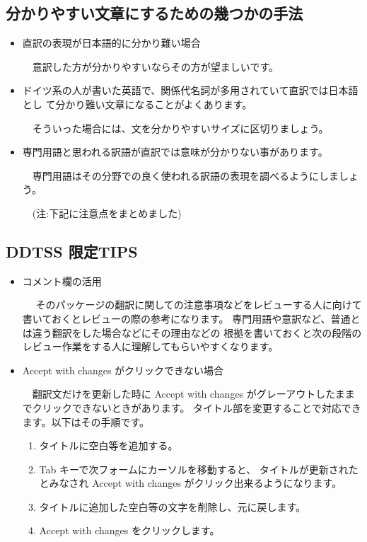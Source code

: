 \documentclass[mingoth,a4paper]{jsarticle}
\begin{document}
\subsection{分かりやすい文章にするための幾つかの手法}
\begin{itemize}
\item {直訳の表現が日本語的に分かり難い場合

　意訳した方が分かりやすいならその方が望ましいです。}

\item{ドイツ系の人が書いた英語で、関係代名詞が多用されていて直訳では日本語とし
     て分かり難い文章になることがよくあります。

　そういった場合には、文を分かりやすいサイズに区切りましょう。}

\item{専門用語と思われる訳語が直訳では意味が分かりない事があります。

　専門用語はその分野での良く使われる訳語の表現を調べるようにしましょう。

     　(注:下記に注意点をまとめました)}
\end{itemize}

\subsection{DDTSS 限定TIPS}
\begin{itemize}
 \item{コメント欄の活用

　 そのパッケージの翻訳に関しての注意事項などをレビューする人に向けて書いておくとレビューの際の参考になります。
   専門用語や意訳など、普通とは違う翻訳をした場合などにその理由などの
   根拠を書いておくと次の段階のレビュー作業をする人に理解してもらいやすくなります。
　}

 \item  Accept with changes がクリックできない場合

　翻訳文だけを更新した時に Accept with changes がグレーアウトしたままでクリックできないときがあります。
タイトル部を変更することで対応できます。以下はその手順です。
 \begin{enumerate}
  \item タイトルに空白等を追加する。
  \item Tab キーで次フォームにカーソルを移動すると、
	タイトルが更新されたとみなされ Accept with changes がクリック出来るようになります。
  \item タイトルに追加した空白等の文字を削除し、元に戻します。
  \item Accept with changes をクリックします。
 \end{enumerate}

\end{itemize}
\end{document}

